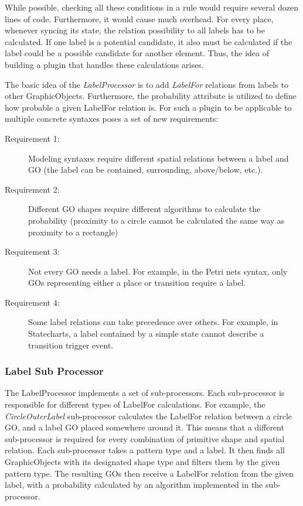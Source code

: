 While possible, checking all these conditions in a rule would require several dozen lines of code. Furthermore, it would cause much overhead. For every place, whenever syncing its state, the relation possibility to all labels has to be calculated. If one label is a potential candidate, it also must be calculated if the label could be a possible candidate for another element. Thus, the idea of building a plugin that handles these calculations arises.

The basic idea of the \emph{LabelProcessor} is to add \emph{LabelFor} relations from labels to other GraphicObjects. Furthermore, the probability attribute is utilized to define how probable a given LabelFor relation is. For such a plugin to be applicable to multiple concrete syntaxes poses a set of new requirements:
\begin{description}
  \item[Requirement 1:] Modeling syntaxes require different spatial relations between a label and GO (the label can be contained, surrounding, above/below, etc.).
  \item[Requirement 2:] Different GO shapes require different algorithms to calculate the probability (proximity to a circle cannot be calculated the same way as proximity to a rectangle)
  \item[Requirement 3:] Not every GO needs a label. For example, in the Petri nets syntax, only GOs representing either a place or transition require a label.
  \item[Requirement 4:]  Some label relations can take precedence over others. For example, in Statecharts, a label contained by a simple state cannot describe a transition trigger event. 
\end{description}


\subsubsection{Label Sub Processor}
The LabelProcessor implements a set of sub-processors. Each sub-processor is responsible for different types of LabelFor calculations. For example, the \emph{CircleOuterLabel} sub-processor calculates the LabelFor relation between a circle GO, and a label GO placed somewhere around it. This means that a different sub-processor is required for every combination of primitive shape and spatial relation. Each sub-processor takes a pattern type and a label. It then finds all GraphicObjects with its designated shape type and filters them by the given pattern type. The resulting GOs then receive a LabelFor relation from the given label, with a probability calculated by an algorithm implemented in the sub-processor.

